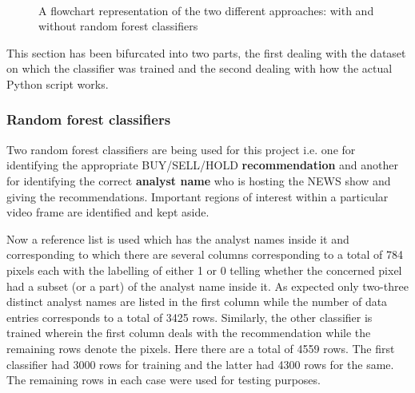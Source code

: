 \begin{figure}[h]
  \centering
   \\
  \vspace{1.5cm}
  \caption{A flowchart representation of the two different
  approaches: with and without random forest classifiers}
  \label{fig:not_rf_and_rf}
\end{figure}

This section has been bifurcated into two parts, the first dealing
with the dataset on which the classifier was trained and the second
dealing with how the actual Python script works.

\subsubsection{Random forest classifiers}
Two random forest classifiers are being used for this project i.e.
one for identifying the appropriate BUY/SELL/HOLD
\textbf{recommendation} and another for identifying the correct
\textbf{analyst name} who is hosting the NEWS show and giving the
recommendations. Important regions of interest within a particular
video frame are identified and kept aside. \par

Now a reference list is used which has the analyst names inside it
and corresponding to which there are several columns corresponding to
a total of 784 pixels each with the labelling of either 1 or 0
telling whether the concerned pixel had a subset (or a part) of the
analyst name inside it. As expected only two-three distinct analyst
names are listed in the first column while the number of data entries
corresponds to a total of 3425 rows. Similarly, the other classifier
is trained wherein the first column deals with the recommendation
while the remaining rows denote the pixels. Here there are a total of
4559 rows. The first classifier had 3000 rows for training and the
latter had 4300 rows for the same. The remaining rows in each case
were used for testing purposes. \par

